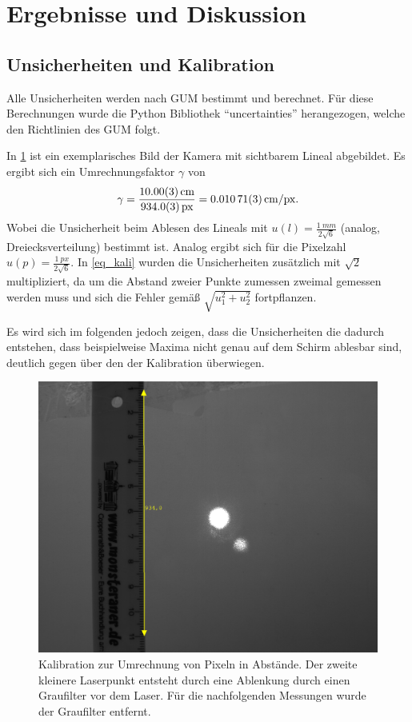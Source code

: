 \documentclass[
	a4paper,
	12pt,
	pagesize,
	ngerman
]{scrartcl}
\begin{document}
	\section{Ergebnisse und Diskussion}

	\subsection{Unsicherheiten und Kalibration}
	Alle Unsicherheiten werden nach GUM bestimmt und berechnet.
	Für diese Berechnungen wurde die Python Bibliothek \enquote{uncertainties} herangezogen, welche den Richtlinien des GUM folgt.

	In \cref{fig_kalibration} ist ein exemplarisches Bild der Kamera mit sichtbarem Lineal abgebildet.
	Es ergibt sich ein Umrechnungsfaktor $\gamma$ von
	\begin{equation}
			\label{eq_kali}
			\gamma = \frac{\SI{10.0+-0.03}{cm}}{\SI{934+-0.3}{px}}=\SI{0.01071+-0.00003}{cm/px}.
	\end{equation}
	Wobei die Unsicherheit beim Ablesen des Lineals mit $u(l)=\frac{\SI{1}{mm}}{2\sqrt{6}}$ (analog, Dreiecksverteilung) bestimmt ist.
	Analog ergibt sich für die Pixelzahl $u(p)=\frac{\SI{1}{px}}{2\sqrt{6}}$.
	In \cref{eq_kali} wurden die Unsicherheiten zusätzlich mit $\sqrt{2}$ multipliziert, da um die Abstand zweier Punkte zumessen zweimal gemessen werden muss und sich die Fehler gemäß $\sqrt{u_1^2+u_2^2}$ fortpflanzen.

	Es wird sich im folgenden jedoch zeigen, dass die Unsicherheiten die dadurch entstehen, dass beispielweise Maxima nicht genau auf dem Schirm ablesbar sind, deutlich gegen über den der Kalibration überwiegen. %


	\begin{figure}[H]
		\includegraphics[width=0.7\linewidth]{raw/0/0_kalibration.png}
					\caption{
						Kalibration zur Umrechnung von Pixeln in Abstände.
						Der zweite kleinere Laserpunkt entsteht durch eine Ablenkung durch einen Graufilter vor dem Laser.
						Für die nachfolgenden Messungen wurde der Graufilter entfernt.
					}
					\label{fig_kalibration}
			\end{figure}
\end{document}

